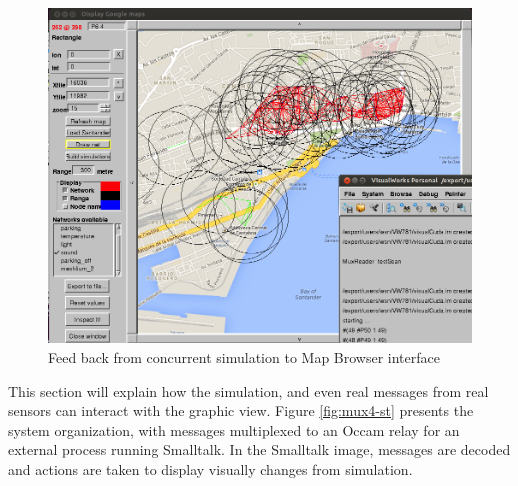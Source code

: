 \begin{figure}[hbtp]
\begin{center}
\leavevmode 
\includegraphics[width=12cm] {netSimul.png}
\caption{Feed back from concurrent simulation to Map Browser interface}
\label{fig:netSimul}
\end{center}
\end{figure}
 

This section will explain how the simulation, and even real messages from real sensors
can interact with the graphic view. Figure \ref{fig:mux4-st} presents the system organization, with
messages multiplexed to an Occam relay for an external process running Smalltalk.
In the Smalltalk image, messages are decoded and actions are taken to display visually
changes from simulation.

